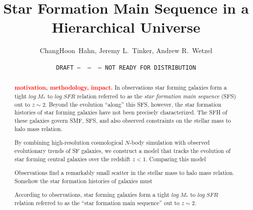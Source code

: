 \documentclass[12pt, letterpaper, preprint]{aastex}
\newcommand{\todo}[1]{{\bf \textcolor{red}{#1}}}
\begin{document}
\sloppy\sloppypar\frenchspacing

\title{Star Formation Main Sequence in a Hierarchical Universe} 
\date{\texttt{DRAFT~---~\githash~---~\gitdate~---~NOT READY FOR DISTRIBUTION}}
\author{ChangHoon~Hahn, 
Jeremy L.~Tinker, 
Andrew R.~Wetzel}

\begin{abstract}
    \todo{motivation, methodology, impact.}
    In observations star forming galaxies form a tight $log\;M_*$ to $log\;SFR$ 
    relation referred to as the {\em star formation main sequence} (SFS) out to $z\sim2$. 
    Beyond the evolution ``along'' this SFS, however, the star formation histories of star 
    forming galaxies have not been precisely characterized. 
    The SFH of these galaxies govern SMF, SFS, and also observed constraints on the stellar mass to halo mass
    relation. 

    By combining high-resolution cosmological $N$-body simulation with observed evolutionary 
    trends of SF galaxies, we construct a model that tracks the evolution of star forming 
    central galaxies over the redshift $z < 1$. Comparing this model 

    Observations find a remarkably small scatter in the stellar mass to halo mass relation. 
    Somehow the star formation histories of galaxies must 
    
    According to observations, star forming galaxies form a tight $log\;M_*$ to $log\;SFR$ 
    relation referred to as the ``star formation main sequence'' out to $z\sim2$. 
\end{abstract}
\end{document}
